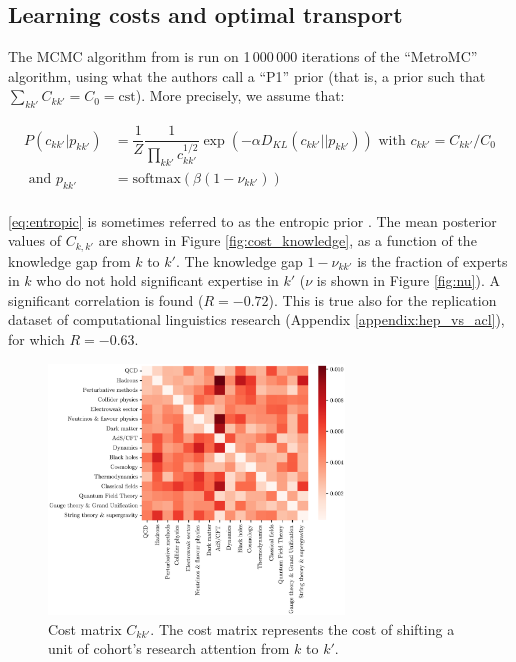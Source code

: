 \documentclass{article}
\begin{document}


\subsection{\label{appendix:optimal_transport}Learning costs and optimal transport}

The MCMC algorithm from \citealt{pmlr-v162-chiu22b} is run on 1\,000\,000 iterations of the ``MetroMC'' algorithm, using what the authors call a ``P1'' prior (that is, a prior such that $\sum_{kk'}C_{kk'}=C_0=\mathrm{cst}$). More precisely, we assume that:

\begin{align}
    P(c_{kk'}|p_{kk'}) &= \dfrac{1}{Z}\dfrac{1}{\displaystyle\prod_{kk'} c_{kk'}^{1/2}} \exp{\left(-\alpha D_{KL}(c_{kk'}||p_{kk'})\right)} \text{ with } c_{kk'} = C_{kk'}/C_0\label{eq:entropic}\\
    \text{ and } p_{kk'} &= \mathrm{softmax}(\beta (1-\nu_{kk'}))\\
\end{align}

\eqref{eq:entropic} is sometimes referred to as the entropic prior \citep{skilling1991bayesian,MacKay1995}. The mean posterior values of $C_{k,k'}$ are shown in Figure \ref{fig:cost_knowledge}, as a function of the knowledge gap from $k$ to $k'$. The knowledge gap  $1-\nu_{kk'}$ is the fraction of experts in $k$ who do not hold significant expertise in $k'$ ($\nu$ is shown in Figure \ref{fig:nu}).  A significant correlation is found ($R=-0.72$). This is true also for the replication dataset of computational linguistics research (Appendix \ref{appendix:hep_vs_acl}), for which $R=-0.63$.

\begin{figure}[H]
    \centering
    \includegraphics[width=0.7\textwidth]{Fig13.eps}
    \caption{Cost matrix $C_{kk'}$. The cost matrix represents the cost of shifting a unit of cohort's research attention from $k$ to $k'$.}
    \label{fig:cost_matrix}
\end{figure}
\end{document}
